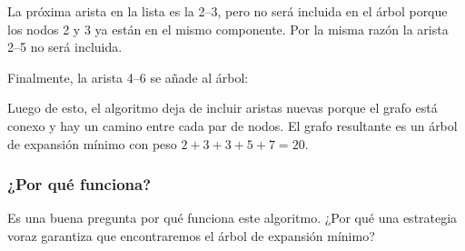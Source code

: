 La próxima arista en la lista es la 2--3, pero no será incluida
en el árbol porque los nodos 2 y 3 ya están en el mismo componente.
Por la misma razón la arista 2--5 no será incluida.

\begin{samepage}
    Finalmente, la arista 4--6 se añade al árbol:
    \begin{center}
    \end{center}
\end{samepage}

Luego de esto, el algoritmo deja de incluir aristas nuevas
porque el grafo está conexo y hay un camino entre cada par de
nodos. El grafo resultante es un árbol de expansión mínimo con peso
$2+3+3+5+7=20$.

\subsubsection{¿Por qué funciona?}

Es una buena pregunta por qué funciona este algoritmo. ¿Por qué
una estrategia voraz garantiza que encontraremos el árbol de expansión
mínimo?

